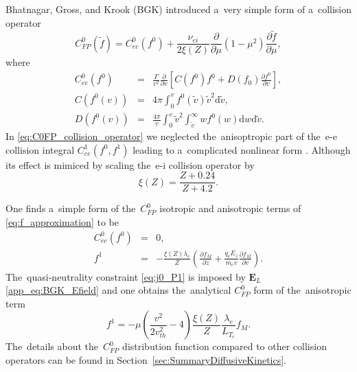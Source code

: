 \documentclass[
 aps,
 jmp,
 amsmath,amssymb,
 twocolumn,
]{revtex4-1}
\newcommand{\pdv}[2]{\frac{\partial{#1}}{\partial{#2}}}
\newcommand{\vect}[1]{\boldsymbol{#1}}
\newcommand{\dI}{\text{d}}
\newcommand{\mfpe}{\lambda_e}
\newcommand{\Zbar}{Z}
\newcommand{\nuei}{\nu_{ei}}
\newcommand{\vmag}{v}
\newcommand{\vth}{v_{th}}
\newcommand{\E}{\vect{E}}
\newcommand{\Ez}{E_z}
\newcommand{\qe}{q_e}
\newcommand{\me}{m_e}
\newcommand{\fM}{f_M}
\newcommand{\fzero}{f_0}
\newcommand{\ft}{f}
\newcommand{\corrMH}[1]{ {\color{red} #1} }
\begin{document}
\corrMH{
Bhatnagar, Gross, and Krook (BGK) introduced a~very simple form
of a~collision operator \cite{BGK_1954}
\begin{equation} 
  C^0_{FP}(\tilde{\ft})
  =
  C^0_{ee}(\ft^0)
  + \frac{\nuei}{2\xi(\Zbar)}
  \pdv{}{\mu}(1 - \mu^2)\pdv{\tilde{\ft}}{\mu} ,
\label{eq:C0FP_collision_operator}
\end{equation}
where
\begin{eqnarray} 
  C^0_{ee}(\ft^0) &=& \frac{\Gamma}{v^2}\frac{\partial}{\partial \vmag}
  \left[C(\ft^0)\ft^0+D(\fzero)\frac{\partial \ft^0}{\partial \vmag}\right] ,
  \label{eq:C0_collision_operator}
  \\
  C(\ft^0(\vmag)) &=& 4\pi\int_0^\vmag \ft^0(\tilde{\vmag}) \tilde{\vmag}^2 
  \dI \tilde{\vmag} ,
  \nonumber
  \\
  D(\ft^0(\vmag)) &=& \frac{4\pi}{\vmag}\int_0^\vmag \tilde{\vmag}^2
  \int_{\tilde{\vmag}}^\infty 
  w \ft^0  (w) \dI w \dI \tilde{\vmag} .
  \nonumber
\end{eqnarray}
In \eqref{eq:C0FP_collision_operator} we neglected the~anisoptropic part
of the~e-e collision integral $C^1_{ee}(\ft^0, \ft^1)$ leading to a~complicated
nonlinear form \cite{Shkarofsky_Particle_Kinetics_book_1966_24}. 
Although its effect is mimiced by scaling the~e-i collision operator by
\begin{equation}
  \xi(\Zbar) 
  = \frac{\Zbar + 0.24}{\Zbar + 4.2} .
  \label{eq:xiSH_approximation}
\end{equation}

One finds a~simple form of
the~$C^0_{FP}$ isotropic and anisotropic terms of \eqref{eq:f_approximation} 
to be
\begin{eqnarray}
  C^0_{ee}(\ft^0) &=& 0 ,
  \label{eq:C0FP_f0} \\
  \ft^1 &=& - \frac{\xi(\Zbar)\mfpe}{\Zbar}
  \left( \pdv{\fM}{z} + \frac{\qe\Ez}{\me\vmag}\pdv{\fM}{\vmag} \right) . 
  \label{eq:C0FP_f1}
\end{eqnarray}
The~quasi-neutrality constraint \eqref{eq:j0_P1} is imposed by $\E_L$
\eqref{app_eq:BGK_Efield} and one obtains 
the~analytical $C^0_{FP}$ form of the~anisotropic term
\begin{equation}
  \ft^1 = - \mu 
  \left( \frac{\vmag^2}{2 \vth^2} - 4\right)\frac{\xi(\Zbar)}{\Zbar}
  \frac{\mfpe}{L_{T_e}}\fM 
  . 
  \label{eq:C0FP_approximation}
\end{equation}
The~details about the~$C^0_{FP}$ distribution function compared to other
collision operators can be found in Section~\ref{sec:SummaryDiffusiveKinetics}.
}
\end{document}
